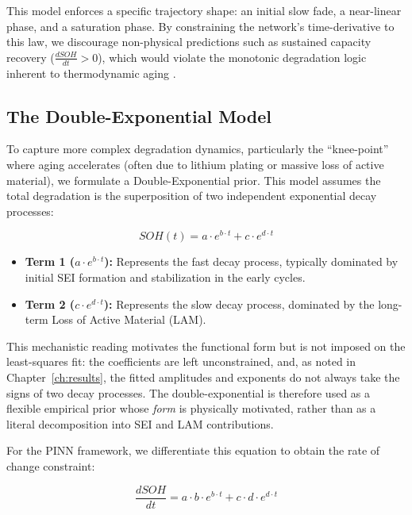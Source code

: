 This model enforces a specific trajectory shape: an initial slow fade, a near-linear phase, and a saturation phase. By constraining the network's time-derivative to this law, we discourage non-physical predictions such as sustained capacity recovery ($\frac{dSOH}{dt} > 0$), which would violate the monotonic degradation logic inherent to thermodynamic aging \cite{ref1_general}.

\subsection{The Double-Exponential Model}

To capture more complex degradation dynamics, particularly the ``knee-point'' where aging accelerates (often due to lithium plating or massive loss of active material), we formulate a Double-Exponential prior. This model assumes the total degradation is the superposition of two independent exponential decay processes:

\begin{equation}
    SOH(t) = a \cdot e^{b \cdot t} + c \cdot e^{d \cdot t}
\end{equation}

\begin{itemize}
    \item \textbf{Term 1 ($a \cdot e^{b \cdot t}$):} Represents the fast decay process, typically dominated by initial SEI formation and stabilization in the early cycles.
    \item \textbf{Term 2 ($c \cdot e^{d \cdot t}$):} Represents the slow decay process, dominated by the long-term Loss of Active Material (LAM).
\end{itemize}

This mechanistic reading motivates the functional form but is not imposed on
the least-squares fit: the coefficients are left unconstrained, and, as noted
in Chapter~\ref{ch:results}, the fitted amplitudes and exponents do not always
take the signs of two decay processes. The double-exponential is therefore
used as a flexible empirical prior whose \emph{form} is physically motivated,
rather than as a literal decomposition into SEI and LAM contributions.

For the PINN framework, we differentiate this equation to obtain the rate of change constraint:

\begin{equation}
    \frac{dSOH}{dt} = a \cdot b \cdot e^{b \cdot t} + c \cdot d \cdot e^{d \cdot t}
\end{equation}

